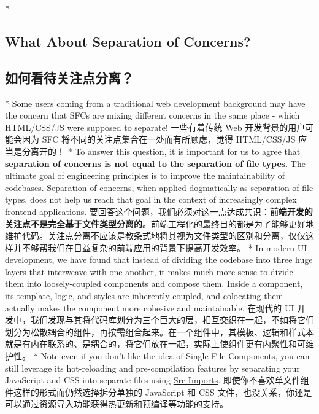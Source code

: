 \begin{paracol}{2}
 
\switchcolumn[0]*%
\subsection{What About Separation of Concerns?}
\switchcolumn
\subsection{如何看待关注点分离？}
\switchcolumn[0]*%
Some users coming from a traditional web development background may have
the concern that SFCs are mixing different concerns in the same place -
which HTML/CSS/JS were supposed to separate!
\switchcolumn
一些有着传统 Web 开发背景的用户可能会因为 SFC
将不同的关注点集合在一处而有所顾虑，觉得 HTML/CSS/JS 应当是分离开的！
\switchcolumn[0]*%
To answer this question, it is important for us to agree that
\textbf{separation of concerns is not equal to the separation of file
types}. The ultimate goal of engineering principles is to improve the
maintainability of codebases. Separation of concerns, when applied
dogmatically as separation of file types, does not help us reach that
goal in the context of increasingly complex frontend applications.
\switchcolumn
要回答这个问题，我们必须对这一点达成共识：\textbf{前端开发的关注点不是完全基于文件类型分离的}。前端工程化的最终目的都是为了能够更好地维护代码。关注点分离不应该是教条式地将其视为文件类型的区别和分离，仅仅这样并不够帮我们在日益复杂的前端应用的背景下提高开发效率。
\switchcolumn[0]*%
In modern UI development, we have found that instead of dividing the
codebase into three huge layers that interweave with one another, it
makes much more sense to divide them into loosely-coupled components and
compose them. Inside a component, its template, logic, and styles are
inherently coupled, and colocating them actually makes the component
more cohesive and maintainable.
\switchcolumn
在现代的 UI
开发中，我们发现与其将代码库划分为三个巨大的层，相互交织在一起，不如将它们划分为松散耦合的组件，再按需组合起来。在一个组件中，其模板、逻辑和样式本就是有内在联系的、是耦合的，将它们放在一起，实际上使组件更有内聚性和可维护性。
\switchcolumn[0]*%
Note even if you don't like the idea of Single-File Components, you can
still leverage its hot-reloading and pre-compilation features by
separating your JavaScript and CSS into separate files using
\href{https://vuejs.org/api/sfc-spec.html\#src-imports}{Src Imports}.
\switchcolumn
即使你不喜欢单文件组件这样的形式而仍然选择拆分单独的 JavaScript 和 CSS
文件，也没关系，你还是可以通过\href{https://cn.vuejs.org/api/sfc-spec.html\#src-imports}{资源导入}功能获得热更新和预编译等功能的支持。
\end{paracol}
 